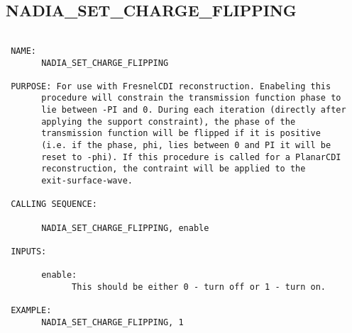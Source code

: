   
 
\subsection{NADIA\_SET\_CHARGE\_FLIPPING}
\begin{verbatim}

 NAME:
       NADIA_SET_CHARGE_FLIPPING

 PURPOSE: For use with FresnelCDI reconstruction. Enabeling this
       procedure will constrain the transmission function phase to
       lie between -PI and 0. During each iteration (directly after
       applying the support constraint), the phase of the
       transmission function will be flipped if it is positive
       (i.e. if the phase, phi, lies between 0 and PI it will be
       reset to -phi). If this procedure is called for a PlanarCDI
       reconstruction, the contraint will be applied to the
       exit-surface-wave.

 CALLING SEQUENCE:

       NADIA_SET_CHARGE_FLIPPING, enable

 INPUTS:

       enable:
             This should be either 0 - turn off or 1 - turn on.

 EXAMPLE:
       NADIA_SET_CHARGE_FLIPPING, 1

\end{verbatim}






  
 
